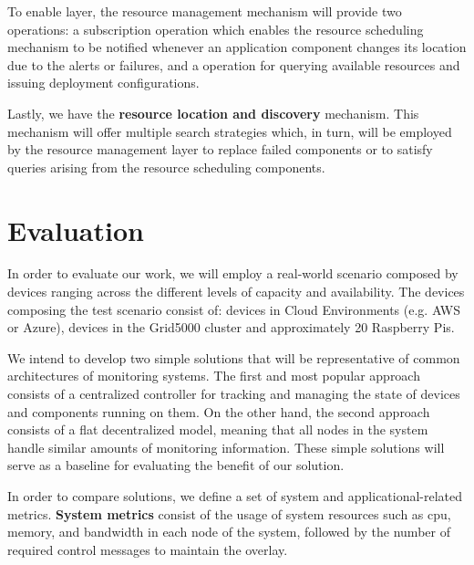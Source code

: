 
To enable layer, the resource management mechanism will provide two operations: a subscription operation which enables the resource scheduling mechanism to be notified whenever an application component changes its location due to the alerts or failures, and a operation for querying available resources and issuing deployment configurations. 

Lastly, we have the \textbf{resource location and discovery} mechanism. This mechanism will offer multiple search strategies which, in turn, will be employed by the resource management layer to replace failed components or to satisfy queries arising from the resource scheduling components.

\section{Evaluation}  

In order to evaluate our work, we will employ a real-world scenario composed by devices ranging across the different levels of capacity and availability. The devices composing the test scenario consist of: devices in Cloud Environments (e.g. AWS or Azure), devices in the Grid5000 cluster and approximately 20 Raspberry Pis.

We intend to develop two simple solutions 
that will be representative of common architectures of monitoring systems. The first and most popular approach consists of a centralized controller for tracking and managing the state of devices and components running on them. %
On the other hand, the second approach consists of a flat decentralized model, 
meaning that all nodes in the system handle similar amounts of monitoring information. These simple solutions will serve as a baseline for evaluating the benefit of our solution.

In order to compare solutions, we define a set of system and applicational-related metrics. \textbf{System metrics} consist of the usage of system resources such as cpu, memory, and bandwidth in each node of the system, followed by the number of required control messages to maintain the overlay.

